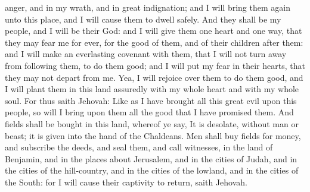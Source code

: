 anger, and in my wrath, and in great indignation; and I will bring them again unto this place, and I will cause them to dwell safely. And they shall be my people, and I will be their God: and I will give them one heart and one way, that they may fear me for ever, for the good of them, and of their children after them: and I will make an everlasting covenant with them, that I will not turn away from following them, to do them good; and I will put my fear in their hearts, that they may not depart from me. Yea, I will rejoice over them to do them good, and I will plant them in this land assuredly with my whole heart and with my whole soul. For thus saith Jehovah: Like as I have brought all this great evil upon this people, so will I bring upon them all the good that I have promised them. And fields shall be bought in this land, whereof ye say, It is desolate, without man or beast; it is given into the hand of the Chaldeans. Men shall buy fields for money, and subscribe the deeds, and seal them, and call witnesses, in the land of Benjamin, and in the places about Jerusalem, and in the cities of Judah, and in the cities of the hill-country, and in the cities of the lowland, and in the cities of the South: for I will cause their captivity to return, saith Jehovah. 


